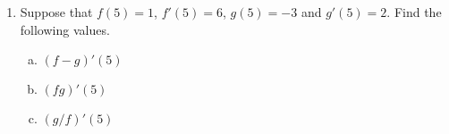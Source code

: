 \documentclass[11pt,fleqn]{article}
\begin{document}
\begin{enumerate}
\begin{flushleft}
  \end{flushleft}
  
\item Suppose that $f(5) = 1$, $f'(5) = 6$, $g(5) = -3$
and $g'(5) = 2$. Find the following values. 


  \begin{multicols}{3}{
      \vspace*{-0.45in}
      \begin{enumerate}[(a)]
      \item $(f - g)'(5)$
      \item $(fg)'(5)$
      \item $(g/f)'(5)$
      \end{enumerate}}
  \end{multicols}
\vskip2in
\end{enumerate}
\end{document}
